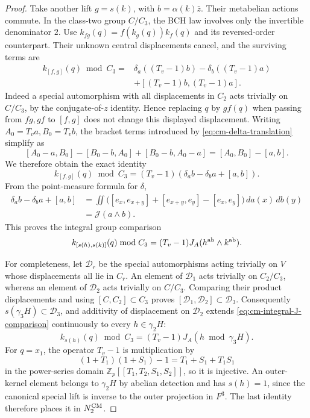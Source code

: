 \documentclass[11pt]{article}
\theoremstyle{definition}\newtheorem{definition}[theorem]{Definition}
\begin{document}
\begin{proof}
Take another lift \(g=s(k)\), with
\(b=\alpha(k)\bar z\).  Their metabelian actions
commute.  In the class-two group \(C/C_3\), the BCH
law involves only the invertible denominator \(2\).
Use
\(k_{fg}(q)=f(k_g(q))k_f(q)\) and its reversed-order
counterpart.  Their unknown central displacements
cancel, and the surviving terms are
\begin{align*}
 k_{[f,g]}(q)\bmod C_3
  ={}&\delta_a((T_v-1)b)-\delta_b((T_v-1)a)\\
     &+[(T_v-1)b,(T_v-1)a].
\end{align*}
Indeed a special automorphism with all displacements
in \(C_2\) acts trivially on \(C/C_3\), by the
conjugate-of-\(z\) identity.  Hence replacing \(q\)
by \(gf(q)\) when passing from \(fg,gf\) to
\([f,g]\) does not change this displayed displacement.
Writing \(A_0=T_va,B_0=T_vb\), the bracket terms
introduced by \eqref{eq:cm-delta-translation} simplify as
\[
 [A_0-a,B_0]-[B_0-b,A_0]+[B_0-b,A_0-a]
                         =[A_0,B_0]-[a,b].
\]
We therefore obtain the exact identity
\[
 k_{[f,g]}(q)\bmod C_3
       =(T_v-1)(\delta_ab-\delta_ba+[a,b]).
\]
From the point-measure formula for \(\delta\),
\begin{align*}
 \delta_ab-\delta_ba+[a,b]
 &=\iint\bigl([e_x,e_{x+y}]+[e_{x+y},e_y]
                         -[e_x,e_y]\bigr)\,da(x)\,db(y)\\
 &=\mathcal J(a\wedge b).
\end{align*}
This proves the integral group comparison
\begin{equation}\label{eq:cm-integral-J-comparison}
 k_{[s(h),s(k)]}(q)\bmod C_3
      =(T_v-1)J_A(h^{\rm ab}\wedge k^{\rm ab}).
\end{equation}

For completeness, let \(\mathcal D_r\) be the special
automorphisms acting trivially on \(V\) whose
displacements all lie in \(C_r\).
An element of \(\mathcal D_1\) acts trivially on
\(C_2/C_3\), whereas an element of \(\mathcal D_2\)
acts trivially on \(C/C_3\).  Comparing their product
displacements and using \([C,C_2]\subset C_3\) proves
\([\mathcal D_1,\mathcal D_2]\subset\mathcal D_3\).
Consequently \(s(\gamma_3H)\subset\mathcal D_3\),
and additivity of displacement on \(\mathcal D_2\)
extends \eqref{eq:cm-integral-J-comparison} continuously
to every \(h\in\gamma_2H\):
\[
 k_{s(h)}(q)\bmod C_3=(T_v-1)J_A(h\bmod\gamma_3H).
\]
For \(q=x_1\), the operator \(T_v-1\) is multiplication
by
\[
 (1+T_1)(1+S_1)-1=T_1+S_1+T_1S_1
\]
in the power-series domain
\(\mathbb Z_p[[T_1,T_2,S_1,S_2]]\), so it is injective.
An outer-kernel element belongs to \(\gamma_2H\) by
abelian detection and has \(s(h)=1\), since the
canonical special lift is inverse to the outer
projection in \(F^3\).  The last identity therefore
places it in \(N_2^{\rm CM}\).


\end{proof}
\end{document}
